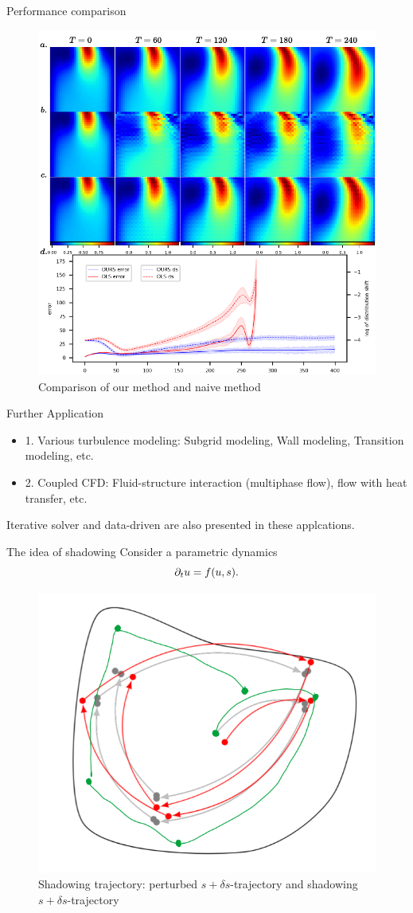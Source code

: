 \documentclass[NUS-Kajima workshop]{beamer}
\begin{document}
\begin{frame}{Performance comparison}
	\begin{figure}[H]
          \centering
          \centerline{\includegraphics[width=.7\linewidth]{fig/NS-TR.pdf}}
          \caption{Comparison of our method and naive method}
\end{figure}
\end{frame}

\begin{frame}{Further Application}
	\begin{itemize}
		\item 1. Various turbulence modeling: Subgrid modeling, Wall modeling, Transition modeling, etc.
		\item 2. Coupled CFD: Fluid-structure interaction (multiphase flow), flow with heat transfer, etc.
	\end{itemize}
	Iterative solver and data-driven are also presented in these applcations.
\end{frame}

\begin{frame}{The idea of shadowing}
	Consider a parametric dynamics
	\begin{equation}
		\partial_t u = f(u, s).
	\end{equation}
	\begin{figure}[H]
          \centering
          \centerline{\includegraphics[width=.6\linewidth]{fig/shadowing.png}}
          \caption{Shadowing trajectory: {\color{green} perturbed $s+\delta s$-trajectory} and {\color{red} shadowing $s+\delta s$-trajectory}}
\end{figure}
\end{frame}
\end{document}
